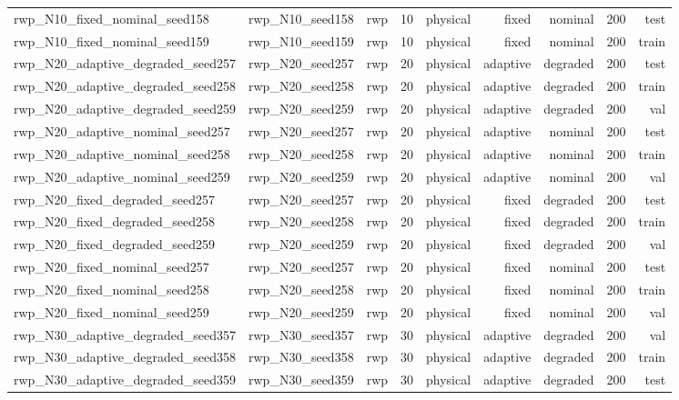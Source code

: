 \begin{tabular}{lrrrrrrrr}
rwp\_N10\_fixed\_nominal\_seed158 & rwp\_N10\_seed158 & rwp & 10 & physical & fixed & nominal & 200 & test \\
rwp\_N10\_fixed\_nominal\_seed159 & rwp\_N10\_seed159 & rwp & 10 & physical & fixed & nominal & 200 & train \\
rwp\_N20\_adaptive\_degraded\_seed257 & rwp\_N20\_seed257 & rwp & 20 & physical & adaptive & degraded & 200 & test \\
rwp\_N20\_adaptive\_degraded\_seed258 & rwp\_N20\_seed258 & rwp & 20 & physical & adaptive & degraded & 200 & train \\
rwp\_N20\_adaptive\_degraded\_seed259 & rwp\_N20\_seed259 & rwp & 20 & physical & adaptive & degraded & 200 & val \\
rwp\_N20\_adaptive\_nominal\_seed257 & rwp\_N20\_seed257 & rwp & 20 & physical & adaptive & nominal & 200 & test \\
rwp\_N20\_adaptive\_nominal\_seed258 & rwp\_N20\_seed258 & rwp & 20 & physical & adaptive & nominal & 200 & train \\
rwp\_N20\_adaptive\_nominal\_seed259 & rwp\_N20\_seed259 & rwp & 20 & physical & adaptive & nominal & 200 & val \\
rwp\_N20\_fixed\_degraded\_seed257 & rwp\_N20\_seed257 & rwp & 20 & physical & fixed & degraded & 200 & test \\
rwp\_N20\_fixed\_degraded\_seed258 & rwp\_N20\_seed258 & rwp & 20 & physical & fixed & degraded & 200 & train \\
rwp\_N20\_fixed\_degraded\_seed259 & rwp\_N20\_seed259 & rwp & 20 & physical & fixed & degraded & 200 & val \\
rwp\_N20\_fixed\_nominal\_seed257 & rwp\_N20\_seed257 & rwp & 20 & physical & fixed & nominal & 200 & test \\
rwp\_N20\_fixed\_nominal\_seed258 & rwp\_N20\_seed258 & rwp & 20 & physical & fixed & nominal & 200 & train \\
rwp\_N20\_fixed\_nominal\_seed259 & rwp\_N20\_seed259 & rwp & 20 & physical & fixed & nominal & 200 & val \\
rwp\_N30\_adaptive\_degraded\_seed357 & rwp\_N30\_seed357 & rwp & 30 & physical & adaptive & degraded & 200 & val \\
rwp\_N30\_adaptive\_degraded\_seed358 & rwp\_N30\_seed358 & rwp & 30 & physical & adaptive & degraded & 200 & train \\
rwp\_N30\_adaptive\_degraded\_seed359 & rwp\_N30\_seed359 & rwp & 30 & physical & adaptive & degraded & 200 & test \\

\end{tabular}
